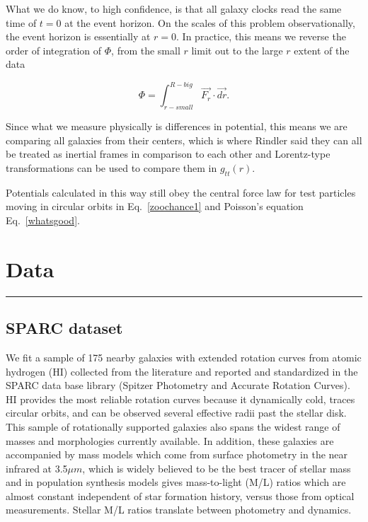 \documentclass[reprint,%
 amsmath,amssymb,
 aps,
]{revtex4-1}
\begin{document}
What we do know, to high confidence,     is that all galaxy clocks read the same time of $t=0$ at the event horizon. On the scales of this problem observationally, the event horizon is essentially at $r=0$. 
  In practice,  this   means we  reverse the 
    order of integration of $\Phi$,   from the small $r$ limit out  to the large $r$  extent of the data  

 \begin{equation}
     \Phi  =   \int^{R-big}_{r-small} \vec{F_r}\cdot\vec{dr}  . 
      \label{eq:Newt2}
      \end{equation}
 
   Since what we measure physically is differences in potential, this means we are comparing all galaxies from their centers, which is where  Rindler said  they can all  be treated as inertial frames in comparison to each other and  Lorentz-type transformations can be used to compare them in  $g_{tt}(r)$. 
  
  
  Potentials calculated in this way still obey the central force law for test particles moving in circular orbits in Eq.~\ref{zoochance1} and Poisson's equation Eq.~\ref{whatsgood}.
   
  

   
 
 

  
 


\section{Data \label{sec:data}}

{\color{red}  }
{\color{red} \rule{\linewidth}{0.5mm}}
\subsection{SPARC dataset}
 
 We fit a sample  of  175 nearby galaxies with extended rotation curves from atomic hydrogen (HI) collected from the literature and reported and standardized in  the SPARC data base library (Spitzer Photometry and Accurate Rotation Curves\cite{2016Lelli}). HI provides the most reliable
 rotation curves because it dynamically cold, traces circular orbits, and can be observed several effective radii past the stellar disk. 
 This sample of rotationally supported galaxies also spans the widest range of masses and morphologies currently available. In addition, these galaxies are  accompanied by mass models which come from surface photometry in the 
   near infrared  at 3.5$\mu m$, which is widely believed to be the best tracer of stellar mass and in population synthesis models  gives mass-to-light (M/L) ratios which are almost constant independent of star formation history,  versus those from   optical measurements\cite{BelldYong,10.1093/mnras/sty3223}.  Stellar M/L ratios   translate between photometry and dynamics. 
   
\end{document}
